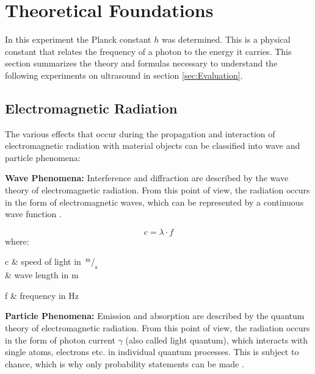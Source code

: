 \section{Theoretical Foundations}
\label{sec:Theoretical_Foundations}
In this experiment the Planck constant $h$ was determined. This is a physical constant that relates the frequency of a photon to the energy it carries. This section summarizes the theory and formulas necessary to understand the following experiments on ultrasound in section \ref{sec:Evaluation}.

\subsection{Electromagnetic Radiation}
\label{subsec:Electromagnetic_Radiation}
The various effects that occur during the propagation and interaction of electromagnetic radiation with material objects can be classified into wave and particle phenomena:

\textbf{Wave Phenomena:} Interference and diffraction are described by the wave theory of electromagnetic radiation. From this point of view, the radiation occurs in the form of electromagnetic waves, which can be represented by a continuous wave function \cite{light_quantum}.

\begin{equation}
c = \lambda\cdot f
\label{eq:wave_length_frequency}
\end{equation}
where:
\begin{multicols}{2}
	\begin{center}
		\begin{conditions}
			c & speed of light in $\,^{\text{m}}\!/_{\text{s}}$ \\
			\lambda & wave length in m
		\end{conditions}
		\begin{conditions}
			f & frequency in Hz
		\end{conditions}
	\end{center}
\end{multicols}

\textbf{Particle Phenomena:} Emission and absorption are described by the quantum theory of electromagnetic radiation. From this point of view, the radiation occurs in the form of photon current $\gamma$ (also called light quantum), which interacts with single atoms, electrons etc. in individual quantum processes. This is subject to chance, which is why only probability statements can be made \cite{light_quantum}.

